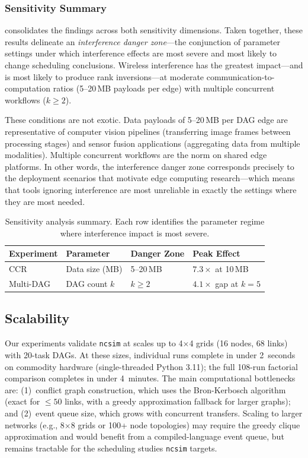 \documentclass[conference]{IEEEtran}
\newcommand{\ncsim}{\texttt{ncsim}}
\begin{document}
\subsubsection{Sensitivity Summary}

 consolidates the findings across both
sensitivity dimensions.  Taken together, these results delineate an
\emph{interference danger zone}---the conjunction of parameter settings
under which interference effects are most severe and most likely to change
scheduling conclusions.  Wireless interference has the greatest
impact---and is most likely to produce rank inversions---at moderate
communication-to-computation ratios (5--20\,MB payloads per edge) with
multiple concurrent workflows ($k \geq 2$).

These conditions are not exotic.  Data payloads of 5--20\,MB per DAG edge
are representative of computer vision pipelines (transferring image frames
between processing stages) and sensor fusion applications (aggregating data
from multiple modalities).  Multiple concurrent workflows are the norm on
shared edge platforms.  In other words, the interference danger zone
corresponds precisely to the deployment scenarios that motivate edge
computing research---which means that tools ignoring interference are most
unreliable in exactly the settings where they are most needed.

\begin{table}[t]
\centering
\caption{Sensitivity analysis summary.  Each row identifies the
parameter regime where interference impact is most severe.}
\label{tab:sensitivity_summary}
\begin{tabular}{@{}llll@{}}
\toprule
\textbf{Experiment} & \textbf{Parameter} & \textbf{Danger Zone} & \textbf{Peak Effect} \\
\midrule
CCR         & Data size (MB)  & 5--20\,MB          & $7.3\times$ at 10\,MB \\
Multi-DAG   & DAG count $k$   & $k \geq 2$        & $4.1\times$ gap at $k{=}5$ \\
\bottomrule
\end{tabular}
\end{table}


\subsection{Scalability}
\label{sec:scalability}

Our experiments validate \ncsim{} at scales up to 4$\times$4 grids (16
nodes, 68 links) with 20-task DAGs.  At these sizes, individual runs
complete in under 2~seconds on commodity hardware (single-threaded Python
3.11); the full 108-run factorial comparison completes in under 4~minutes.  The main
computational bottlenecks are: (1)~conflict graph construction, which uses
the Bron-Kerbosch algorithm (exact for $\leq 50$ links, with a greedy
approximation fallback for larger graphs); and (2)~event queue size, which
grows with concurrent transfers.  Scaling to larger networks (e.g.,
8$\times$8 grids or 100+ node topologies) may require the greedy clique
approximation and would benefit from a compiled-language event queue, but
remains tractable for the scheduling studies \ncsim{} targets.
\end{document}
